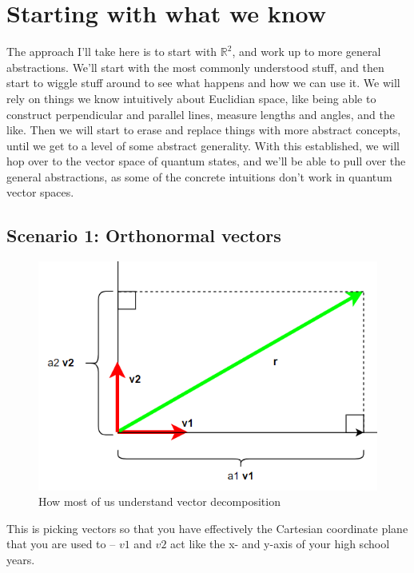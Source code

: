 \documentclass[
]{book}
\begin{document}
\hypertarget{starting-with-what-we-know}{%
\section{Starting with what we know}\label{starting-with-what-we-know}}

The approach I'll take here is to start with \(\mathbb{R}^2\), and work up to more general abstractions. We'll start with the most commonly understood stuff, and then start to wiggle stuff around to see what happens and how we can use it. We will rely on things we know intuitively about Euclidian space, like being able to construct perpendicular and parallel lines, measure lengths and angles, and the like. Then we will start to erase and replace things with more abstract concepts, until we get to a level of some abstract generality. With this established, we will hop over to the vector space of quantum states, and we'll be able to pull over the general abstractions, as some of the concrete intuitions don't work in quantum vector spaces.

\hypertarget{scenario-1-orthonormal-vectors}{%
\subsection{Scenario 1: Orthonormal vectors}\label{scenario-1-orthonormal-vectors}}

\begin{figure}

{\centering \includegraphics[width=0.75\linewidth,height=0.75\textheight]{images/orthonormal-decomposition} 

}

\caption{How most of us understand vector decomposition}\label{fig:unnamed-chunk-7}
\end{figure}

This is picking vectors so that you have effectively the Cartesian coordinate plane that you are used to -- \(v1\) and \(v2\) act like the x- and y-axis of your high school years.
\end{document}

